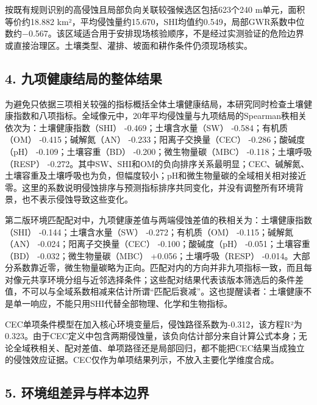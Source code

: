 \documentclass[
  a4paper,
  12pt]{ctexart}
\begin{document}
按既有规则识别的高侵蚀且局部负向关联较强候选区包括623个240
m单元，面积等价约18.882
km²，平均侵蚀量约15.670，SHI均值约0.549，局部GWR系数中位数约−0.567。该区域适合用于安排现场核验顺序，不是经过实测验证的危险边界或直接治理区。土壤类型、灌排、坡面和耕作条件仍须现场核实。

\hypertarget{ux4e5dux9879ux5065ux5eb7ux7ed3ux5c40ux7684ux6574ux4f53ux7ed3ux679c}{%
\subsection{4.
九项健康结局的整体结果}\label{ux4e5dux9879ux5065ux5eb7ux7ed3ux5c40ux7684ux6574ux4f53ux7ed3ux679c}}

为避免只依据三项相关较强的指标概括全体土壤健康结局，本研究同时检查土壤健康指数和八项指标。全域像元中，20年平均侵蚀量与九项结局的Spearman秩相关依次为：土壤健康指数（SHI）
-0.469；土壤含水量（SW） -0.584；有机质（OM） -0.415；碱解氮（AN）
-0.233；阳离子交换量（CEC） -0.286；酸碱度（pH） -0.109；土壤容重（BD）
-0.200；微生物量碳（MBC） -0.118；土壤呼吸（RESP）
-0.272。其中SW、SHI和OM的负向排序关系最明显；CEC、碱解氮、土壤容重及土壤呼吸也为负，但幅度较小；pH和微生物量碳的全域相关相对接近零。这里的系数说明侵蚀排序与预测指标排序共同变化，并没有调整所有环境背景，也不表示侵蚀导致这些变化。

第二版环境匹配配对中，九项健康差值与两端侵蚀差值的秩相关为：土壤健康指数（SHI）
-0.144；土壤含水量（SW） -0.272；有机质（OM） -0.115；碱解氮（AN）
-0.024；阳离子交换量（CEC） -0.100；酸碱度（pH） -0.051；土壤容重（BD）
-0.032；微生物量碳（MBC） +0.056；土壤呼吸（RESP）
-0.014。大部分系数靠近零，微生物量碳略为正向。匹配对内的方向并非九项指标一致，而且每对像元共享环境分组与近邻选择条件；这些配对结果代表该版本筛选后的条件差值，不可以与全域系数相减来估计所谓``匹配后衰减''。这也提醒读者：土壤健康不是单一响应，不能只用SHI代替全部物理、化学和生物指标。

CEC单项条件模型在加入核心环境变量后，侵蚀路径系数为-0.312，该方程R²为0.323。由于CEC定义中包含两期侵蚀量，该负向估计部分来自计算公式本身；无论全域秩相关、配对差值、单项路径还是局部回归，都不能把CEC结果当成独立的侵蚀效应证据。CEC仅作为单项结果列示，不放入主要化学维度合成。

\hypertarget{ux73afux5883ux7ec4ux5deeux5f02ux4e0eux6837ux672cux8fb9ux754c}{%
\subsection{5.
环境组差异与样本边界}\label{ux73afux5883ux7ec4ux5deeux5f02ux4e0eux6837ux672cux8fb9ux754c}}
\end{document}

